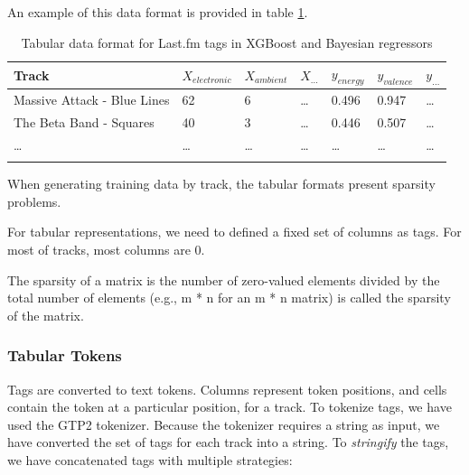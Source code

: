 \documentclass[sn-mathphys]{sn-jnl}%
\theoremstyle{thmstyleone}%
\theoremstyle{thmstyletwo}%
\theoremstyle{thmstylethree}%
\begin{document}
An example of this data format is provided in table \ref{tabular_tags_format}.

\begin{table}[h]
      \begin{center}
      \begin{minipage}{\textwidth}
      \caption{Tabular data format for Last.fm tags in XGBoost and Bayesian regressors}\label{tabular_tags_format}%
      \begin{tabular}{@{}lllllll@{}}
      \toprule
      Track                         & $X_{electronic}$ & $X_{ambient}$ & $X_{\dots}$ & $y_{energy}$ & $y_{valence}$ & $y_{\dots}$ \\
      \midrule
      Massive Attack - Blue Lines   & 62               & 6             &  \dots      & 0.496        & 0.947         & \dots  \\
      The Beta Band - Squares       & 40               & 3             &  \dots      & 0.446        & 0.507         & \dots  \\
      \dots                         & \dots            & \dots         &  \dots      & \dots        & \dots         & \dots  \\
      \botrule
      \end{tabular}
      \end{minipage}
      \end{center}
\end{table}

When generating training data by track, the tabular formats present sparsity problems.

For tabular representations, we need to defined a fixed set of columns as tags.
For most of tracks, most columns are 0.

The sparsity of a matrix is the number of zero-valued elements divided by the total number of elements
(e.g., m * n for an m * n matrix) is called the sparsity of the matrix.


\subsubsection{Tabular Tokens}

Tags are converted to text tokens. Columns represent token positions, and cells contain the token at a particular position, for a track.
To tokenize tags, we have used the GTP2 tokenizer.
Because the tokenizer requires a string as input, we have converted the set of tags for each track into a string.
To \emph{stringify} the tags, we have concatenated tags with multiple strategies:
\end{document}
